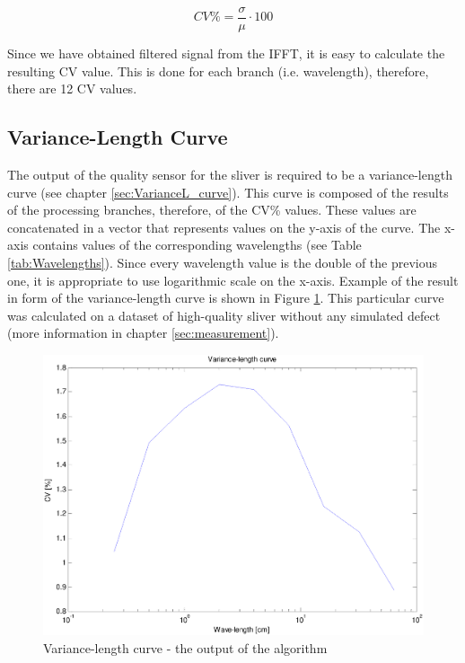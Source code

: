 \documentclass[twoside]{ctuthesis}
\theoremstyle{plain}
\theoremstyle{definition}
\theoremstyle{note}
\begin{document}
\begin{equation} \label{eq:CVCalculation}
	CV\% = \frac{\sigma}{\mu} \cdot 100
\end{equation}

Since we have obtained filtered signal from the IFFT, it is easy to calculate the resulting CV value. This is done for each branch (i.e. wavelength), therefore, there are 12 CV values.

\subsection{Variance-Length Curve}
The output of the quality sensor for the sliver is required to be a variance-length curve (see chapter \ref{sec:VarianceL_curve}). This curve is composed of the results of the processing branches, therefore, of the CV\% values. These values are concatenated in a vector that represents values on the y-axis of the curve. The x-axis contains values of the corresponding wavelengths (see Table \ref{tab:Wavelengths}). Since every wavelength value is the double of the previous one, it is appropriate to use logarithmic scale on the x-axis. Example of the result in form of the variance-length curve is shown in Figure \ref{fig:VLC_example11}. This particular curve was calculated on a dataset of high-quality sliver without any simulated defect (more information in chapter \ref{sec:measurement}). 

\begin{figure}[h]
	\centering
	\includegraphics[width=1.0\textwidth]{full_VLC_11.eps}
	\caption{Variance-length curve - the output of the algorithm}
	\label{fig:VLC_example11}
\end{figure}
\end{document}
